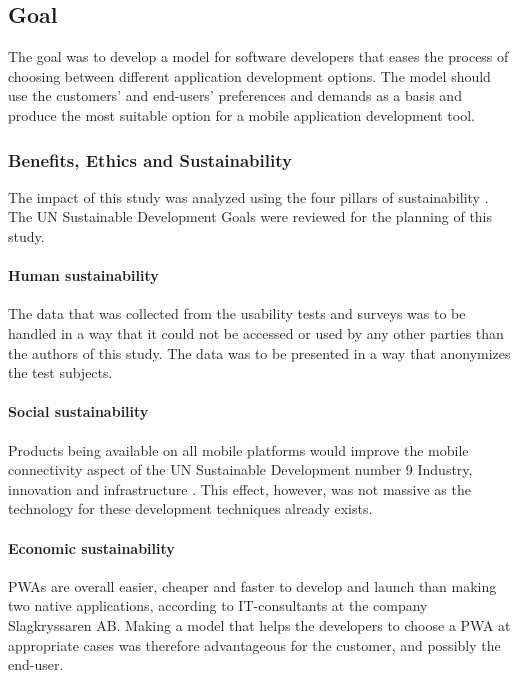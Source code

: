 \subsection{Goal}

The goal was to develop a model for software developers that eases the process of choosing between different application development options. The model should use the customers’ and end-users’ preferences and demands as a basis and produce the most suitable option for a mobile application development tool.

\subsubsection{Benefits, Ethics and Sustainability}

The impact of this study was analyzed using the four pillars of sustainability \cite{FourSustainabilityPillars2017}. The UN Sustainable Development Goals  \cite{UNSustainabilityGoals} were reviewed for the planning of this study.

\paragraph{Human sustainability} 

The data that was collected from the usability tests and surveys was to be handled in a way that it could not be accessed or used by any other parties than the authors of this study. The data was to be presented in a way that anonymizes the test subjects.

\paragraph{Social sustainability}

Products being available on all mobile platforms would improve the mobile connectivity aspect of the UN Sustainable Development number 9 Industry, innovation and infrastructure \cite{UNSustainabilityGoals}. This effect, however, was not massive as the technology for these development techniques already exists. 

\paragraph{Economic sustainability}

PWAs are overall easier, cheaper and faster to develop and launch than making two native applications, according to IT-consultants at the company Slagkryssaren AB. Making a model that helps the developers to choose a PWA at appropriate cases was therefore advantageous for the customer, and possibly the end-user.

